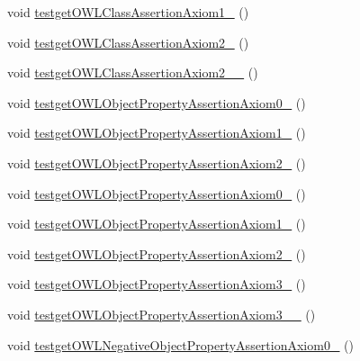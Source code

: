 \begin{DoxyCompactItemize}
void \hyperlink{classorg_1_1semanticweb_1_1owlapi_1_1api_1_1test_1_1_null_check_test_case_ace18162edafb55a1d8acc1a49156bef7}{testget\-O\-W\-L\-Class\-Assertion\-Axiom1\-\_} ()
\item 
void \hyperlink{classorg_1_1semanticweb_1_1owlapi_1_1api_1_1test_1_1_null_check_test_case_a13e25bc1ac4090ffc3eb8029c0a0dc86}{testget\-O\-W\-L\-Class\-Assertion\-Axiom2\-\_} ()
\item 
void \hyperlink{classorg_1_1semanticweb_1_1owlapi_1_1api_1_1test_1_1_null_check_test_case_a49b9f64efda21d9f3d9d35790a774e9f}{testget\-O\-W\-L\-Class\-Assertion\-Axiom2\-\_\-\_} ()
\item 
void \hyperlink{classorg_1_1semanticweb_1_1owlapi_1_1api_1_1test_1_1_null_check_test_case_a5b82301f4e2eac928cc2d1b42440c50c}{testget\-O\-W\-L\-Object\-Property\-Assertion\-Axiom0\-\_} ()
\item 
void \hyperlink{classorg_1_1semanticweb_1_1owlapi_1_1api_1_1test_1_1_null_check_test_case_a965cbbfc022f9c25abfd565dc329c171}{testget\-O\-W\-L\-Object\-Property\-Assertion\-Axiom1\-\_} ()
\item 
void \hyperlink{classorg_1_1semanticweb_1_1owlapi_1_1api_1_1test_1_1_null_check_test_case_a4f3c7ecccda19690cb8e780d09b8bd4e}{testget\-O\-W\-L\-Object\-Property\-Assertion\-Axiom2\-\_} ()
\item 
void \hyperlink{classorg_1_1semanticweb_1_1owlapi_1_1api_1_1test_1_1_null_check_test_case_a4aaf18fc2bd45063eb0d5c04ee5dca4e}{testget\-O\-W\-L\-Object\-Property\-Assertion\-Axiom0\-\_} ()
\item 
void \hyperlink{classorg_1_1semanticweb_1_1owlapi_1_1api_1_1test_1_1_null_check_test_case_a5798280c51cfdbfe29448ec1596dbf3d}{testget\-O\-W\-L\-Object\-Property\-Assertion\-Axiom1\-\_} ()
\item 
void \hyperlink{classorg_1_1semanticweb_1_1owlapi_1_1api_1_1test_1_1_null_check_test_case_a781611af452c2de9492fcbc99afd946c}{testget\-O\-W\-L\-Object\-Property\-Assertion\-Axiom2\-\_} ()
\item 
void \hyperlink{classorg_1_1semanticweb_1_1owlapi_1_1api_1_1test_1_1_null_check_test_case_a44203165a00d417ff5096f8df8c32ee5}{testget\-O\-W\-L\-Object\-Property\-Assertion\-Axiom3\-\_} ()
\item 
void \hyperlink{classorg_1_1semanticweb_1_1owlapi_1_1api_1_1test_1_1_null_check_test_case_a6fba590bffc0151c5ab2c1a2c9c7384b}{testget\-O\-W\-L\-Object\-Property\-Assertion\-Axiom3\-\_\-\_} ()
\item 
void \hyperlink{classorg_1_1semanticweb_1_1owlapi_1_1api_1_1test_1_1_null_check_test_case_af78486cc4391bc695f0b2395b62fc46f}{testget\-O\-W\-L\-Negative\-Object\-Property\-Assertion\-Axiom0\-\_} ()

\end{DoxyCompactItemize}
